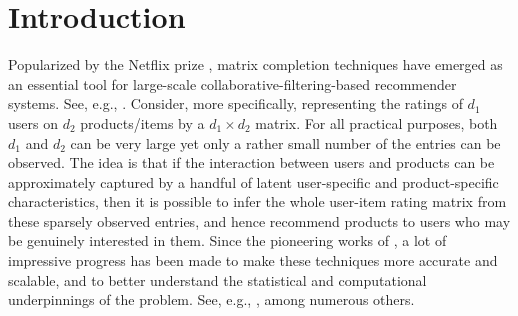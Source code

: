 \documentclass[12pt]{article}
\theoremstyle{plain}
\begin{document}
\begin{sloppypar}

\section{Introduction}\label{sec:intro}

Popularized by the Netflix prize \citep{bennett2007netflix}, matrix completion techniques have emerged as an essential tool for large-scale collaborative-filtering-based recommender systems. See, e.g., \cite{resnick1997recommender,schafer2007collaborative, koren2009matrix, davidson2010youtube, mcauley2013hidden,das2017survey}. Consider, more specifically, representing the ratings of $d_1$ users on $d_2$ products/items by a $d_1\times d_2$ matrix. For all practical purposes, both $d_1$ and $d_2$ can be very large yet only a rather small number of the entries can be observed. The idea is that if the interaction between users and products can be approximately captured by a handful of latent user-specific and product-specific characteristics, then it is possible to infer the whole user-item rating matrix from these sparsely observed entries, and hence recommend products to users who may be genuinely interested in them. Since the pioneering works of \cite{candes2009power,candes2010matrix,candes2012exact}, a lot of impressive progress has been made to make these techniques more accurate and scalable, and to better understand the statistical and computational underpinnings of the problem. See, e.g., \cite{cai2010singular,keshavan2010matrix,recht2010guaranteed,gross2011recovering,koltchinskii2011nuclear,liu2011universal,negahban2011estimation,rohde2011estimation,tsybakov2011nuclear,negahban2012restricted, sun2012calibrated, klopp2014noisy,cai2015rop,cai2016matrix,gao2016optimal}, among numerous others. 


\end{sloppypar}
\end{document}
